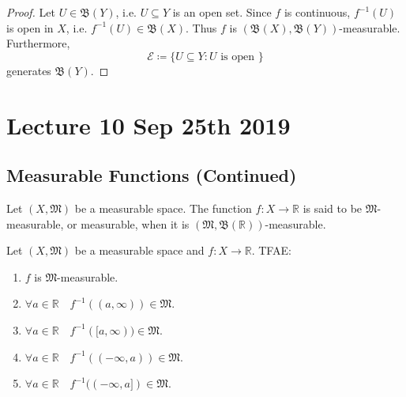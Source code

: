 \documentclass[notoc,notitlepage]{tufte-book}
\begin{document}
\begin{proof}
  Let $U \in \mathfrak{B}(Y)$, i.e. $U \subseteq Y$ is an open set.
  Since $f$ is continuous, $f^{-1}(U)$ is open in $X$,
  i.e. $f^{-1}(U) \in \mathfrak{B}(X)$.
  Thus $f$ is $(\mathfrak{B}(X), \mathfrak{B}(Y))$-measurable.
  Furthermore,
  \begin{equation*}
    \mathcal{E} \coloneqq \{ U \subseteq Y : U \text{ is open } \}
  \end{equation*}
  generates $\mathfrak{B}(Y)$.
\end{proof}



\chapter{Lecture 10 Sep 25th 2019}%
\label{chp:lecture_10_sep_25th_2019}

\section{Measurable Functions (Continued)}%
\label{sec:measurable_functions_continued}

\begin{notation}
  Let $(X, \mathfrak{M})$ be a measurable space.
  The function $f : X \to \mathbb{R}$ is said to be $\mathfrak{M}$-measurable,
  or measurable, when it is
  $(\mathfrak{M}, \mathfrak{B}(\mathbb{R}))$-measurable.
\end{notation}

\begin{propo}\label{propo:characteristics_of_m_measurable_functions}
  Let $(X, \mathfrak{M})$ be a measurable space and $f : X \to \mathbb{R}$.
  TFAE:
  \begin{enumerate}
    \item $f$ is $\mathfrak{M}$-measurable.
    \item $\forall a \in \mathbb{R} \quad f^{-1}((a, \infty)) \in \mathfrak{M}$.
    \item $\forall a \in \mathbb{R} \quad f^{-1}([a, \infty)) \in \mathfrak{M}$.
    \item $\forall a \in \mathbb{R} \quad f^{-1}((-\infty, a)) \in \mathfrak{M}$.
    \item $\forall a \in \mathbb{R} \quad f^{-1}((-\infty, a]) \in \mathfrak{M}$.
  \end{enumerate}
\end{propo}
\end{document}
